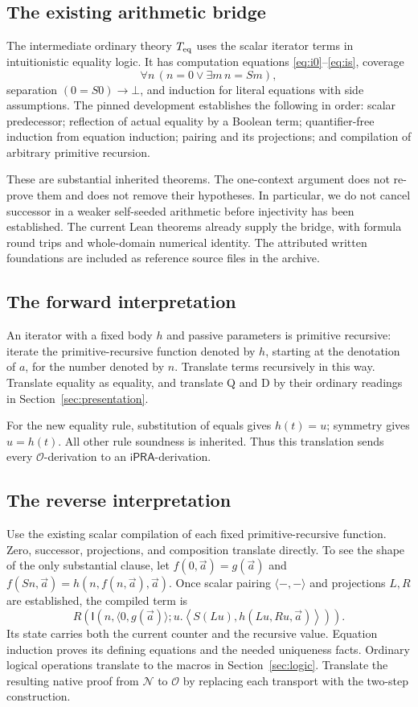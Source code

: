 \documentclass[11pt,letterpaper]{article}
\theoremstyle{definition}\newtheorem{definition}[theorem]{Definition}
\theoremstyle{remark}\newtheorem{remark}[theorem]{Remark}
\newcommand{\N}{\mathcal N}
\newcommand{\Ocal}{\mathcal O}
\newcommand{\ipra}{\mathsf{iPRA}}
\newcommand{\I}{\mathsf I}
\begin{document}
\subsection{The existing arithmetic bridge}
The intermediate ordinary theory \(T_{\rm eq}\) uses the scalar iterator
terms in intuitionistic equality logic. It has computation equations
\eqref{eq:i0}--\eqref{eq:is}, coverage
\[
 \forall n\,(n=0\vee\exists m\,n=Sm),
\]
separation \((0=S0)\to\bot\), and induction for literal equations with
side assumptions. The pinned development establishes the following in
order: scalar predecessor; reflection of actual equality by a Boolean
term; quantifier-free induction from equation induction; pairing and its
projections; and compilation of arbitrary primitive recursion.

These are substantial inherited theorems. The one-context argument does
not re-prove them and does not remove their hypotheses. In particular,
we do not cancel successor in a weaker self-seeded arithmetic before
injectivity has been established. The current Lean theorems already supply
the bridge, with formula round trips and whole-domain numerical identity.
The attributed written foundations are included as reference source files
in the archive.\cite{foundations,ordinarybi}

\subsection{The forward interpretation}
An iterator with a fixed body \(h\) and passive parameters is primitive
recursive: iterate the primitive-recursive function denoted by \(h\),
starting at the denotation of \(a\), for the number denoted by \(n\).
Translate terms recursively in this way. Translate equality as equality,
and translate Q and D by their ordinary readings in
Section~\ref{sec:presentation}.

For the new equality rule, substitution of equals gives
\(h(t)=u\); symmetry gives \(u=h(t)\). All other rule soundness is
inherited. Thus this translation sends every \(\Ocal\)-derivation to an
\(\ipra\)-derivation.

\subsection{The reverse interpretation}
Use the existing scalar compilation of each fixed primitive-recursive
function. Zero, successor, projections, and composition translate
directly. To see the shape of the only substantial clause, let
\(f(0,\vec a)=g(\vec a)\) and
\(f(Sn,\vec a)=h(n,f(n,\vec a),\vec a)\). Once scalar pairing
\(\langle-,-\rangle\) and projections \(L,R\) are established, the
compiled term is
\[
 R\!\left(\I\left(n,\langle0,g(\vec a)\rangle;
   u.\left\langle S(Lu),h(Lu,Ru,\vec a)\right\rangle\right)\right).
 \tag{13}
\]
Its state carries both the current counter and the recursive value.
Equation induction proves its defining equations and the needed
uniqueness facts. Ordinary logical operations translate to the macros in
Section~\ref{sec:logic}. Translate the resulting native proof from
\(\N\) to \(\Ocal\) by replacing each transport with the two-step
construction.
\end{document}

